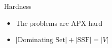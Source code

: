 \begin{frame}[<+>]{Hardness}
\begin{itemize}
  \item The problems are APX-hard
  \item $|\text{Dominating Set}| + |\text{SSF}| = |V|$
\end{itemize}
\onslide<+>
\begin{center}

\end{center}
\end{frame}